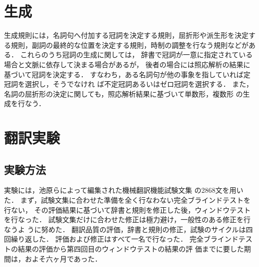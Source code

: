 \section{生成}
\label{sec:generation}

生成規則には，名詞句へ付加する冠詞を決定する規則，屈折形や派生形を決定す
る規則，副詞の最終的な位置を決定する規則，時制の調整を行なう規則などがある．
これらのうち冠詞の生成に関しては，
辞書で冠詞が一意に指定されている場合と文脈に依存して決まる場合があるが，
後者の場合には照応解析の結果に基づいて冠詞を決定する．
すなわち，ある名詞句が他の事象を指していれば定冠詞を選択し，そうでなけれ
ば不定冠詞あるいはゼロ冠詞を選択する．
また，名詞の屈折形の決定に関しても，照応解析結果に基づいて単数形，複数形
の生成を行なう．

\section{翻訳実験}
\label{sec:experiment}

\subsection{実験方法}

実験には，池原らによって編集された機械翻訳機能試験文集\cite{Ikehara94}
の2868文を用いた．
まず，試験文集に合わせた準備を全く行なわない完全ブラインドテストを行ない，
その評価結果に基づいて辞書と規則を修正した後，ウィンドウテストを行なった．
試験文集だけに合わせた修正は極力避け，一般性のある修正を行なうよ
うに努めた．
翻訳品質の評価，辞書と規則の修正，試験のサイクルは四回繰り返した．
評価および修正はすべて一名で行なった．
完全ブラインドテストの結果の評価から第四回目のウィンドウテストの結果の評
価までに要した期間は，およそ六ヶ月であった．

